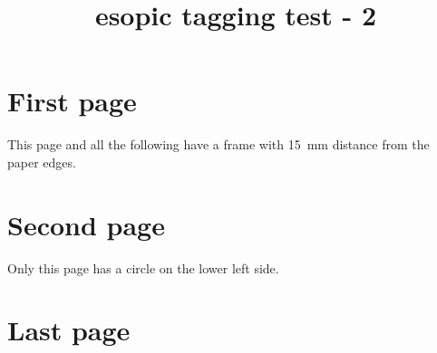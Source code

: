 \documentclass[a4paper]{article}
\title{esopic tagging test - 2}
\begin{document}
  \section*{First page}

  This page and all the following have a frame with 15~mm
  distance from the paper edges.
  
  \newpage

  \section*{Second page}


  Only this page has a circle on the lower left side.

  \newpage

  \section*{Last page}
\end{document}
